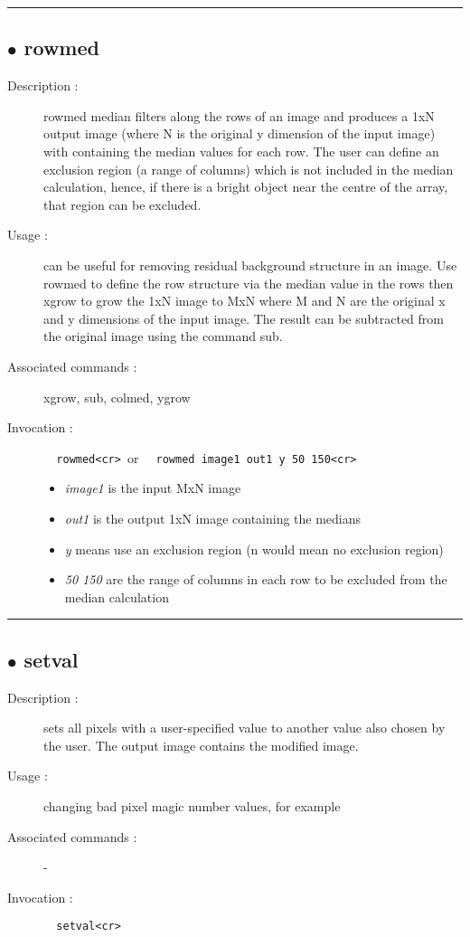 \hrule \subsection*{$\bullet$ rowmed}
\begin{description}
\item[Description :] rowmed median filters along the rows of an image and produces a
1xN output image (where N is the original y dimension of the input
image) with containing the median values for each row.  The user can
define an exclusion region (a range of columns) which is not included in
the median calculation, hence, if there is a bright object near the
centre of the array, that region can be excluded.
\item[Usage :] can be useful for removing residual background structure in an
image.  Use rowmed to define the row structure via the median value in
the rows then xgrow to grow the 1xN image to MxN where M and N are the
original x and y dimensions of the input image.  The result can be
subtracted from the original image using the command sub.
\item[Associated commands :] xgrow, sub, colmed, ygrow
\item[Invocation :]

\verb+  rowmed<cr> +or \verb+  rowmed image1 out1 y 50 150<cr> +

\begin{itemize}

\item {\sl image1 } is the input MxN image
\item {\sl out1 } is the output 1xN image containing the medians
\item {\sl y } means use an exclusion region (n would mean no exclusion
 region)
\item {\sl 50 150 } are the range of columns in each row to be excluded
 from the median calculation
\end{itemize}\end{description}

\hrule \subsection*{$\bullet$ setval}
\begin{description}
\item[Description :] sets all pixels with a user-specified value to another value
also chosen by the user.  The output image contains the modified image.
\item[Usage :] changing bad pixel magic number values, for example
\item[Associated commands :] -
\item[Invocation :]

\verb+  setval<cr> +\end{description}

